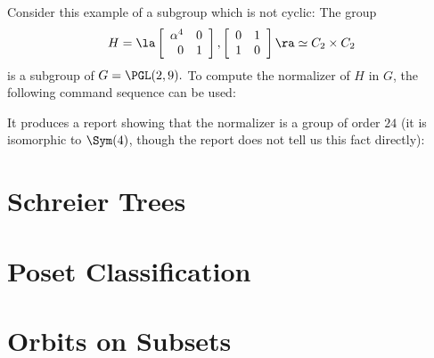 \bigskip




Consider this example of a subgroup which is not cyclic:
The group 
$$
H = \la
\left[
\begin{array}{*{2}{r}}
\alpha^{4} & 0\\
0 & 1\\
\end{array}
\right]
, 
\left[
\begin{array}{*{2}{r}}
0 & 1\\
1 & 0\\
\end{array}
\right]
\ra \simeq C_2 \times C_2
$$
is a subgroup of $G=\PGL(2,9).$ 
To compute the normalizer of $H$ in $G$, the following command sequence can be used:
{\tt

}
It produces a report showing that the normalizer is a group of order $24$ 
(it is isomorphic to $\Sym(4)$, though the report does not tell us this fact directly):
\begin{mdframed}[style=MyFrame]

\end{mdframed}



\section{Schreier Trees}
\label{sec:orbit:algorithms}



\bigskip


\clearpage



\section{Poset Classification}
\label{sec:posetclassification}







\clearpage


\section{Orbits on Subsets}
\label{sec:subsetorbits}






\bigskip

\clearpage

